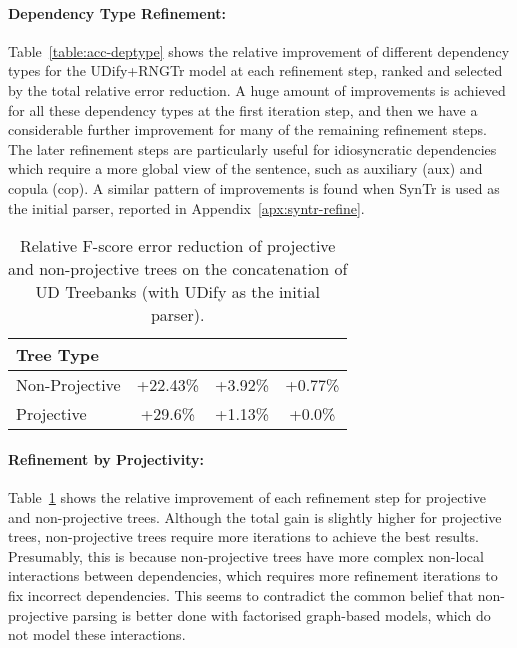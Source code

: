 \paragraph{Dependency Type Refinement:}
Table~\ref{table:acc-deptype} shows the relative improvement of different dependency types for the UDify+RNGTr model at each refinement step, ranked and selected by the total relative error reduction.
A huge amount of improvements is achieved for all these dependency types at the first iteration step, and then we have a considerable further improvement for many of the remaining refinement steps.
The later refinement steps are particularly useful for idiosyncratic dependencies which require a more global view of the sentence, such as auxiliary (aux) and copula (cop).
A similar pattern of improvements is found when SynTr is used as the initial parser, reported in Appendix~\ref{apx:syntr-refine}.


\begin{table}
\centering
  \begin{adjustbox}{width=\linewidth}
    \begin{tabular}{|l|c|c|c|}
    \hline
    Tree Type &  &  &  \\
    \hline
    Non-Projective & +22.43\% & +3.92\% & +0.77\% \\
    Projective & +29.6\% & +1.13\% & +0.0\% \\
    \hline
    \end{tabular}
  \end{adjustbox}
\caption{Relative F-score error reduction of projective and non-projective trees on the concatenation of UD Treebanks (with UDify as the initial parser).
}
\label{table:pr-non-proj}
\end{table}

\paragraph{Refinement by Projectivity:}
Table~\ref{table:pr-non-proj} shows the relative improvement of each refinement step for projective and non-projective trees.  Although the total gain is slightly higher for projective trees, non-projective trees require more iterations to achieve the best results.  Presumably, this is because non-projective trees have more complex non-local interactions between dependencies, which requires more refinement iterations to fix incorrect dependencies.  This seems to contradict the common belief that non-projective parsing is better done with factorised graph-based models, which do not model these interactions.
